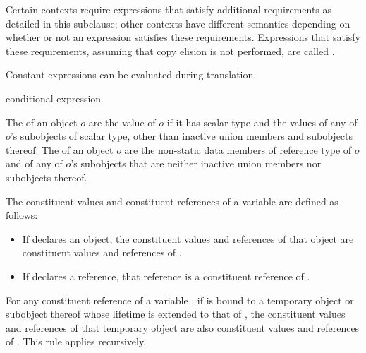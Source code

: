 \documentclass{wg21}
\begin{document}
\pnum
Certain contexts require expressions that satisfy additional
requirements as detailed in this subclause; other contexts have different
semantics depending on whether or not an expression satisfies these requirements.
Expressions that satisfy these requirements,
assuming that copy elision is not performed,
are called
%
.
\begin{note}
    Constant expressions can be evaluated
    during translation.
\end{note}

\begin{bnf}
    \br
    conditional-expression
\end{bnf}


\begin{addedblock}
The  of an object $o$ are the value of $o$ if it has scalar type and the values of
any of $o$’s subobjects of scalar type, other than inactive union members and subobjects
thereof. The  of an object $o$ are the non-static data members of
reference type of $o$ and of any of $o$’s subobjects that are neither inactive union members nor
subobjects thereof.
\end{addedblock}


\begin{addedblock}
The constituent values and constituent references of a variable  are defined as follows:
\begin{itemize}
\item If  declares an object, the constituent values and references of that object are
constituent values and references of .
\item If  declares a reference, that reference is a constituent reference of .
\end{itemize}
For any constituent reference  of a variable , if  is bound to a temporary object or
subobject thereof whose lifetime is extended to that of , the constituent values and
references of that temporary object are also constituent values and references of . This rule
applies recursively.
\end{addedblock}

\end{document}

